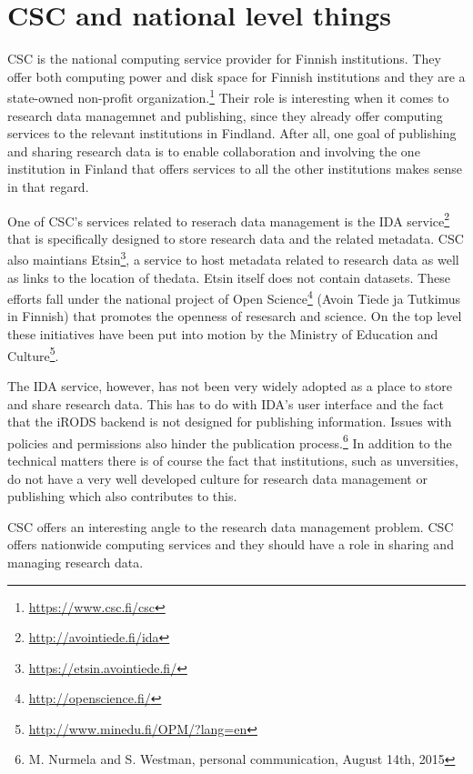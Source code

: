 \fi

\section{CSC and national level things}

CSC is the national computing service provider for Finnish institutions. They
offer both computing power and disk space for Finnish institutions and they
are a state-owned non-profit organization.\footnote{\url{https://www.csc.fi/csc}}
Their role is interesting when it comes to research data managemnet and
publishing, since they already offer computing services to the relevant
institutions in Findland. After all, one goal of publishing and sharing
research data is to enable collaboration and involving the one institution
in Finland that offers services to all the other institutions makes sense in
that regard.

One of CSC's services related to reserach data management is the IDA
service\footnote{\url{http://avointiede.fi/ida}} that is specifically
designed to store research data and the related metadata. CSC also maintians
Etsin\footnote{\url{https://etsin.avointiede.fi/}}, a service to host
metadata related to research data as well as links to the location of thedata.
Etsin itself does not contain datasets.
These efforts fall under the national project of Open
Science\footnote{\url{http://openscience.fi/}} (Avoin Tiede ja Tutkimus in
Finnish) that promotes the openness of resesarch and science. On the top level
these initiatives have been put into motion by the Ministry of Education and
Culture\footnote{\url{http://www.minedu.fi/OPM/?lang=en}}.

The IDA service, however, has not been very widely adopted as a place to store
and share research data. This has to do with IDA's user interface and the fact
that the iRODS backend is not designed for publishing information. Issues with
policies and permissions also hinder the publication process.\footnote{M.
Nurmela and S. Westman, personal communication, August 14th, 2015} In addition
to the technical matters there is of course the fact that institutions, such as
unversities, do not have a very well developed culture for research data
management or publishing which also contributes to this.


\iffalse
CSC offers an interesting angle to the research data management problem. CSC
offers nationwide computing services and they should have a role in sharing and
managing research data.

